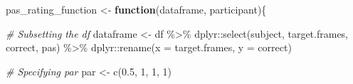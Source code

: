 \documentclass[
]{article}
\newenvironment{Shaded}{\begin{snugshade}}{\end{snugshade}}
\newcommand{\AttributeTok}[1]{\textcolor[rgb]{0.77,0.63,0.00}{#1}}
\newcommand{\CommentTok}[1]{\textcolor[rgb]{0.56,0.35,0.01}{\textit{#1}}}
\newcommand{\ControlFlowTok}[1]{\textcolor[rgb]{0.13,0.29,0.53}{\textbf{#1}}}
\newcommand{\DecValTok}[1]{\textcolor[rgb]{0.00,0.00,0.81}{#1}}
\newcommand{\FloatTok}[1]{\textcolor[rgb]{0.00,0.00,0.81}{#1}}
\newcommand{\FunctionTok}[1]{\textcolor[rgb]{0.00,0.00,0.00}{#1}}
\newcommand{\NormalTok}[1]{#1}
\newcommand{\OtherTok}[1]{\textcolor[rgb]{0.56,0.35,0.01}{#1}}
\newcommand{\SpecialCharTok}[1]{\textcolor[rgb]{0.00,0.00,0.00}{#1}}
\begin{document}
\begin{Shaded}
\begin{Highlighting}[]
\NormalTok{pas\_rating\_function }\OtherTok{\textless{}{-}} \ControlFlowTok{function}\NormalTok{(dataframe, participant)\{}
  
  \CommentTok{\# Subsetting the df}
\NormalTok{  dataframe }\OtherTok{\textless{}{-}}\NormalTok{ df }\SpecialCharTok{\%\textgreater{}\%} 
\NormalTok{    dplyr}\SpecialCharTok{::}\FunctionTok{select}\NormalTok{(subject, target.frames, correct, pas) }\SpecialCharTok{\%\textgreater{}\%} 
\NormalTok{    dplyr}\SpecialCharTok{::}\FunctionTok{rename}\NormalTok{(}\AttributeTok{x =}\NormalTok{ target.frames, }\AttributeTok{y =}\NormalTok{ correct)}
  
  \CommentTok{\# Specifying par}
\NormalTok{  par }\OtherTok{\textless{}{-}} \FunctionTok{c}\NormalTok{(}\FloatTok{0.5}\NormalTok{, }\DecValTok{1}\NormalTok{, }\DecValTok{1}\NormalTok{, }\DecValTok{1}\NormalTok{)}
  

\end{Highlighting}
\end{Shaded}
\end{document}
